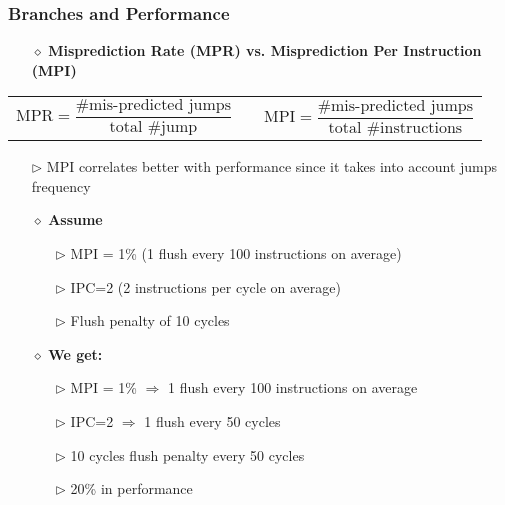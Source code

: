 \documentclass[aspectratio=169]{beamer}
\begin{document}
\begin{frame}
\frametitle{Branches and Performance}
\label{frame:branches_performance}

\begin{itemize}
    \item[$\diamond$] \textbf{Misprediction Rate (MPR) vs. Misprediction Per Instruction (MPI)}
\end{itemize}

\vspace{0.3cm}

\begin{center}
\begin{tabular}{ccc}
$\text{MPR} = \dfrac{\text{\# mis-predicted jumps}}{\text{total \# jump}}$ & \hspace{1cm} & $\text{MPI} = \dfrac{\text{\# mis-predicted jumps}}{\text{total \# instructions}}$
\end{tabular}
\end{center}

\vspace{0.3cm}

\begin{itemize}
    \item[$\triangleright$] MPI correlates better with performance since it takes into account jumps frequency
\end{itemize}

\vspace{0.2cm}

\begin{itemize}
    \item[$\diamond$] \textbf{Assume}
    \begin{itemize}
        \item[$\triangleright$] MPI = 1\% (1 flush every 100 instructions on average)
        \item[$\triangleright$] IPC=2 \hspace{0.5cm} (2 instructions per cycle on average)
        \item[$\triangleright$] Flush penalty of 10 cycles
    \end{itemize}
\end{itemize}

\vspace{0.2cm}

\begin{itemize}
    \item[$\diamond$] \textbf{We get:}
    \begin{itemize}
        \item[$\triangleright$] MPI = 1\% $\Rightarrow$ 1 flush every 100 instructions on average
        \item[$\triangleright$] IPC=2 $\Rightarrow$ 1 flush every 50 cycles
        \item[$\triangleright$] 10 cycles flush penalty every 50 cycles
        \item[$\triangleright$] 20\% in performance
    \end{itemize}
\end{itemize}

\end{frame}
\end{document}
